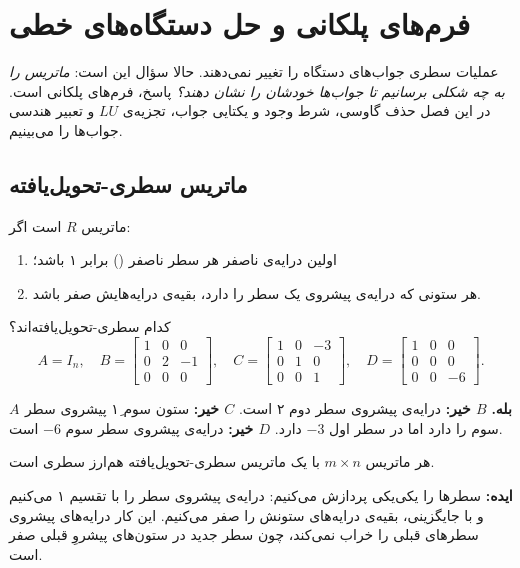 \chapter{فرم‌های پلکانی و حل دستگاه‌های خطی}
\label{ch:echelon}

عملیات سطری  جواب‌های دستگاه را تغییر نمی‌دهند. حالا سؤال این است: \emph{ماتریس را به چه شکلی برسانیم تا جواب‌ها خودشان را نشان دهند؟} پاسخ، فرم‌های پلکانی است. در این فصل حذف گاوسی، شرط وجود و یکتایی جواب، تجزیه‌ی $LU$ و تعبیر هندسی جواب‌ها را می‌بینیم.

\section{ماتریس سطری‌-تحویل‌یافته}

\begin{definition}
ماتریس $R$  است اگر:
\begin{enumerate}
  \item اولین درایه‌ی ناصفر هر سطر ناصفر () برابر ۱ باشد؛
  \item هر ستونی که درایه‌ی پیشروی یک سطر را دارد، بقیه‌ی درایه‌هایش صفر باشد.
\end{enumerate}
\end{definition}

\begin{example}
کدام سطری‌-تحویل‌یافته‌اند؟
\[
A=I_n,\quad
B=\begin{bmatrix}1&0&0\\0&2&-1\\0&0&0\end{bmatrix},\quad
C=\begin{bmatrix}1&0&-3\\0&1&0\\0&0&1\end{bmatrix},\quad
D=\begin{bmatrix}1&0&0\\0&0&0\\0&0&-6\end{bmatrix}.
\]
\end{example}
\begin{solution}
\textbf{$A$ بله.} \textbf{$B$ خیر:} درایه‌ی پیشروی سطر دوم ۲ است. \textbf{$C$ خیر:} ستون سوم ۱ِ پیشروی سطر سوم را دارد اما در سطر اول $-3$ دارد. \textbf{$D$ خیر:} درایه‌ی پیشروی سطر سوم $-6$ است.
\end{solution}

\begin{theorem}\label{thm:row-reduced-exists}
هر ماتریس $m\times n$ با یک ماتریس سطری‌-تحویل‌یافته هم‌ارز سطری  است.
\end{theorem}
\textbf{ایده:} سطرها را یکی‌یکی پردازش می‌کنیم: درایه‌ی پیشروی سطر را با تقسیم ۱ می‌کنیم و با جایگزینی، بقیه‌ی درایه‌های ستونش را صفر می‌کنیم. این کار درایه‌های پیشروی سطرهای قبلی را خراب نمی‌کند، چون سطر جدید در ستون‌های پیشروِ قبلی صفر است.

